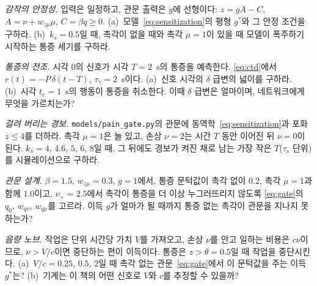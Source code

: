 \begin{exercise}[\lvlB]
\label{ex:14:3}
\emph{감작의 안정성.} 입력은 일정하고, 관문 출력은 $g$에 선형이다: $z=gA-C$, $A=\nu+w_{z\mu}\mu$, $C=\beta q\ge0$. (a)~모델~\eqref{eq:sensitization}의 평형 $g^*$와 그 안정 조건을 구하라. (b)~$k_s=0.5$일 때, 촉각이 없을 때와 촉각 $\mu=1$이 있을 때 모델이 폭주하기 시작하는 통증 세기를 구하라.
\end{exercise}

\begin{exercise}[\lvlA]
\label{ex:14:4}
\emph{통증의 전조.} 시각 $0$의 신호가 시각 $T=2$~s의 통증을 예측한다. \eqref{eq:ctd}에서 $r(t)=-P\,\delta(t-T)$, $\tau_\gamma=2$~s이다. (a)~신호 시각의 $\delta$ 급변의 넓이를 구하라. (b)~시각 $t_e=1$~s의 행동이 통증을 취소한다. 이때 $\delta$ 급변은 얼마이며, 네트워크에게 무엇을 가르치는가?
\end{exercise}

\begin{exercise}[\lvlB]
\label{ex:14:5}
\emph{걸려 버리는 경보.} \texttt{models/\allowbreak pain\_gate.py}의 관문에 동역학~\eqref{eq:sensitization}과 포화 $z\le4$를 더하라. 촉각 $\mu=1$은 늘 있고, 손상 $\nu=2$는 시간 $T$ 동안 이어진 뒤 $\nu=0$이 된다. $k_s=4$, $4.6$, $5$, $6$, $8$일 때, 그 뒤에도 경보가 켜진 채로 남는 가장 작은 $T$($\tau_s$ 단위)를 시뮬레이션으로 구하라.
\end{exercise}

\begin{exercise}[\lvlB]
\label{ex:14:6}
\emph{관문 설계.} $\beta=1.5$, $w_{z\mu}=0.3$, $g=1$에서, 통증 문턱값이 촉각 없이 $0.2$, 촉각 $\mu=1$과 함께 $1.0$이고, $\nu_\times=2.5$에서 촉각이 통증을 더 이상 누그러뜨리지 않도록 \eqref{eq:gate}의 $q_0$, $w_{q\nu}$, $w_{q\mu}$를 고르라. 이득 $g$가 얼마가 될 때까지 통증 없는 촉각이 관문을 지나지 못하는가?
\end{exercise}

\begin{exercise}[\lvlC]
\label{ex:14:7}
\emph{음량 노브.} 작업은 단위 시간당 가치 $V$를 가져오고, 손상 $\nu$를 안고 일하는 비용은 $c\nu$이므로, $\nu>V/c$이면 중단하는 편이 이득이다. 통증은 $z>\theta=0.5$일 때 작업을 중단시킨다. (a)~$V/c=0.25$, $0.5$, $2$일 때 촉각 없는 관문~\eqref{eq:gate}에서 이 문턱값을 주는 이득 $g^*$는? (b)~기계는 이 책의 어떤 신호로 $V$와 $c$를 추정할 수 있을까?
\end{exercise}
